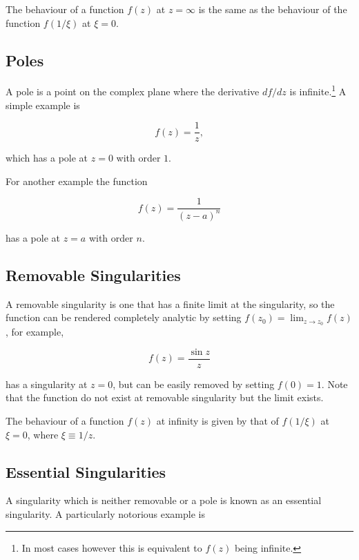 \documentclass[english,a4paper,12pt]{report}
\begin{document}
The behaviour of a function \(f(z)\) at \(z = \infty\) is the same as the behaviour of the function \(f(1 /\xi )\) at \(\xi  = 0\).   

\subsection{Poles}

A pole is a point on the complex plane where the derivative \(df /dz\) is infinite.\footnote{In most cases however this is equivalent to \(f(z)\) being infinite.} A simple example is

\begin{equation}
    f(z) = \frac{1}{z}, 
\end{equation}

which has a pole at \(z = 0\) with order \(1\).

For another example the function

\begin{equation}
    f(z) = \frac{1}{(z-a)^{n} }
\end{equation}

has a pole at \(z = a\) with order \(n\). 

\subsection{Removable Singularities}

A removable singularity is one that has a finite limit at the singularity, so the function can be rendered completely analytic by setting \(f(z_0 ) = \lim_{z \to z_0 } f(z) \), for example,

\begin{equation}
    f(z) = \frac{\sin z}{z} 
\end{equation}

has a singularity at \(z = 0\), but can be easily removed by setting \(f(0) = 1\). Note that the function do not exist at removable singularity but the limit exists.

The behaviour of a function \(f(z)\) at infinity is given by that of \(f(1 /\xi )\) at \(\xi =0\), where \(\xi \equiv 1 /z\).   

\subsection{Essential Singularities}

A singularity which is neither removable or a pole is known as an essential singularity. A particularly notorious example is 
\end{document}
